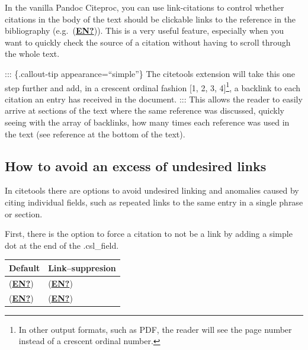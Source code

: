 \documentclass[
  12pt,
  a4paper,
  oneside,
  titlepage,
  toclink=all,
  toc=bibliography]{scrbook}
\theoremstyle{definition}
\theoremstyle{plain}
\theoremstyle{plain}
\theoremstyle{plain}
\theoremstyle{plain}
\theoremstyle{definition}
\theoremstyle{definition}
\theoremstyle{plain}
\theoremstyle{remark}
\begin{document}
In the vanilla Pandoc Citeproc, you can use link-citations to control
whether citations in the body of the text should be clickable links to
the reference in the bibliography
(e.g.~{\protect\hypertarget{cite_103}{}{\label{cite_103}(\protect\hyperlink{ref-EN}{\textbf{EN?}})}}).
This is a very useful feature, especially when you want to quickly check
the source of a citation without having to scroll through the whole
text.

::: \{.callout-tip appearance=\enquote{simple}\} The citetools extension
will take this one step further and add, in a crescent ordinal fashion
{[}1, 2, 3, 4{]}\footnote{In other output formats, such as PDF, the
  reader will see the page number instead of a crescent ordinal number.},
a backlink to each citation an entry has received in the document. :::
This allows the reader to easily arrive at sections of the text where
the same reference was discussed, quickly seeing with the array of
backlinks, how many times each reference was used in the text (see
reference at the bottom of the text).

\hypertarget{sec-scriv52}{%
\subsection{How to avoid an excess of undesired
links}\label{sec-scriv52}}

\protect\hypertarget{scriv52}{}{}

In citetools there are options to avoid undesired linking and anomalies
caused by citing individual fields, such as repeated links to the same
entry in a single phrase or section.

First, there is the option to force a citation to not be a link by
adding a simple dot at the end of the .csl\_field.

\begin{longtable}[]{@{}ll@{}}
\toprule\noalign{}
Default & Link--suppresion \\
\midrule\noalign{}
\endhead
\bottomrule\noalign{}
\endlastfoot
{\protect\hypertarget{cite_104}{}{\label{cite_104}(\protect\hyperlink{ref-EN}{\textbf{EN?}})}}
&
{\protect\hypertarget{cite_105}{}{\label{cite_105}(\protect\hyperlink{ref-EN}{\textbf{EN?}})}} \\
{\protect\hypertarget{cite_106}{}{\label{cite_106}(\protect\hyperlink{ref-EN}{\textbf{EN?}})}}
&
{\protect\hypertarget{cite_107}{}{\label{cite_107}(\protect\hyperlink{ref-EN}{\textbf{EN?}})}} \\
\end{longtable}
\end{document}
